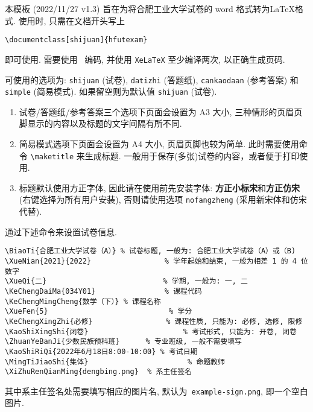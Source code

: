 \documentclass{hfutexam}
\begin{document}



\indent
本模板 (2022/11/27 v1.3) 旨在为将合肥工业大学试卷的 word 格式转为\LaTeX{}格式.
使用时, 只需在文档开头写上
\begin{lstlisting}
\documentclass[shijuan]{hfutexam}
\end{lstlisting}
即可使用.
需要使用~{\color{blue}{\lstinline|UTF-8|}} 编码, 并使用 \lstinline|XeLaTeX| 至少编译两次, 以正确生成页码.

\indent
可使用的选项为: \lstinline|shijuan| (试卷), \lstinline|datizhi| (答题纸), \lstinline|cankaodaan| (参考答案) 和 \lstinline|simple| (简易模式). 如果留空则为默认值 \lstinline|shijuan| (试卷).
\begin{enumerate}
\item 试卷/答题纸/参考答案三个选项下页面会设置为 A3 大小, 三种情形的页眉页脚显示的内容以及标题的文字间隔有所不同.
\item 简易模式选项下页面会设置为 A4 大小, 页眉页脚也较为简单. 此时需要使用命令 \lstinline|\maketitle| 来生成标题.
一般用于保存(多张)试卷的内容，或者便于打印使用.
\item 标题默认使用方正字体, 因此请在使用前先安装字体: {\bfseries\titlesongti 方正小标宋}和{\bfseries\titlefangsong 方正仿宋}(右键选择为所有用户安装), 否则请使用选项 \lstinline|nofangzheng| (采用新宋体和仿宋代替).
\end{enumerate}


\indent
通过下述命令来设置试卷信息.

\textit{\color{blue}{试卷信息示例:}}
\begin{lstlisting}
\BiaoTi{合肥工业大学试卷（A）} % 试卷标题, 一般为: 合肥工业大学试卷（A）或（B)
\XueNian{2021}{2022}                 % 学年起始和结束, 一般为相差 1 的 4 位数字
\XueQi{二}                           % 学期, 一般为: 一, 二
\KeChengDaiMa{034Y01}                % 课程代码
\KeChengMingCheng{数学（下）} % 课程名称
\XueFen{5}                            % 学分
\KeChengXingZhi{必修}	             	% 课程性质, 只能为: 必修, 选修, 限修
\KaoShiXingShi{闭卷}	                 	% 考试形式, 只能为: 开卷, 闭卷
\ZhuanYeBanJi{少数民族预科班} 		% 专业班级, 一般不需要填写
\KaoShiRiQi{2022年6月18日8:00-10:00} % 考试日期
\MingTiJiaoShi{集体}                       % 命题教师
\XiZhuRenQianMing{dengbing.png}  % 系主任签名
\end{lstlisting}
其中系主任签名处需要填写相应的图片名, 默认为~{\color{blue}\lstinline|example-sign.png|}, 即一个空白图片.
\end{document}

